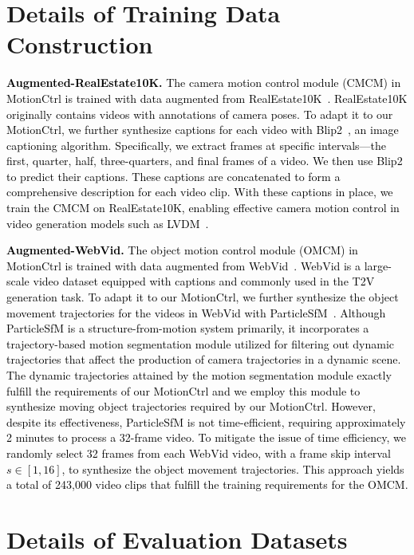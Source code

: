 \documentclass[sigconf]{acmart}
\begin{document}
\section{Details of Training Data Construction}
\label{sec:training_data}

\textcolor{black}{
\noindent\textbf{Augmented-RealEstate10K.}
The camera motion control module (CMCM) in MotionCtrl is trained with data augmented from RealEstate10K~\cite{zhou2018stereo}. RealEstate10K originally contains videos with annotations of camera poses. To adapt it to our MotionCtrl, we further synthesize captions for each video with Blip2~\cite{blip2}, an image captioning algorithm. Specifically, we extract frames at specific intervals—the first, quarter, half, three-quarters, and final frames of a video. We then use Blip2 to predict their captions. These captions are concatenated to form a comprehensive description for each video clip. With these captions in place, we train the CMCM on RealEstate10K, enabling effective camera motion control in video generation models such as LVDM~\cite{he2022lvdm}.
}

\textcolor{black}{
\noindent\textbf{Augmented-WebVid.}
The object motion control module (OMCM) in MotionCtrl is trained with data augmented from WebVid~\cite{bain2021frozen}. WebVid is a large-scale video dataset equipped with captions and commonly used in the T2V generation task. To adapt it to our MotionCtrl, we further synthesize the object movement trajectories for the videos in WebVid with ParticleSfM~\cite{zhao2022particlesfm}. Although ParticleSfM is a structure-from-motion system primarily, it incorporates a trajectory-based motion segmentation module utilized for filtering out dynamic trajectories that affect the production of camera trajectories in a dynamic scene. The dynamic trajectories attained by the motion segmentation module exactly fulfill the requirements of our MotionCtrl and we employ this module to synthesize moving object trajectories required by our MotionCtrl. However, despite its effectiveness, ParticleSfM is not time-efficient, requiring approximately 2 minutes to process a 32-frame video. To mitigate the issue of time efficiency, we randomly select 32 frames from each WebVid video, with a frame skip interval $s \in [1, 16]$, to synthesize the object movement trajectories. This approach yields a total of 243,000 video clips that fulfill the training requirements for the OMCM.
}


\section{Details of Evaluation Datasets}
\label{sec:testset}
\end{document}
